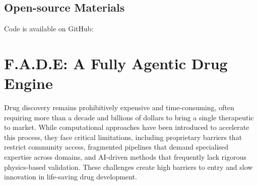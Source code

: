 \subsection*{Open-source Materials}

Code is available on GitHub:  








\section{F.A.D.E: A Fully Agentic Drug Engine}




Drug discovery remains prohibitively expensive and time-consuming, often requiring more than a decade and billions of dollars to bring a single therapeutic to market. While computational approaches have been introduced to accelerate this process, they face critical limitations, including proprietary barriers that restrict community access, fragmented pipelines that demand specialised expertise across domains, and AI-driven methods that frequently lack rigorous physics-based validation. These challenges create high barriers to entry and slow innovation in life-saving drug development.  

